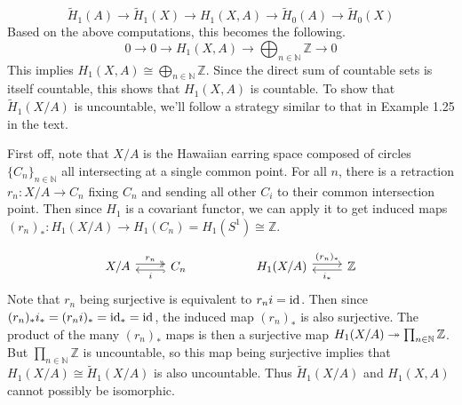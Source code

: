 \documentclass[twoside,10pt]{article}
\begin{document}
\[
	\tilde{H}_1(A) \to \tilde{H}_1(X) \to H_1(X,A) \to \tilde{H}_0(A) \to \tilde{H}_0(X)
\] Based on the above computations, this becomes the following.
\[
	0 \to  0 \to H_1(X,A) \to \bigoplus_{n\in \mathbb{N}} \mathbb{Z} \to 0
\] This implies $H_1(X,A) \cong \bigoplus_{n\in \mathbb{N}}\mathbb{Z}$. Since the direct sum of countable sets is itself countable, this shows that $H_1(X,A)$ is countable. To show that $\tilde{H}_1(X/A)$ is uncountable, we'll follow a strategy similar to that in Example 1.25 in the text.

First off, note that $X/A$ is the Hawaiian earring space composed of circles $\{C_{n}\}_{n \in \mathbb{N}}$ all intersecting at a single common point. For all $n$, there is a retraction $r_{n}:X/A \to C_{n}$ fixing $C_{n}$ and sending all other $C_i$ to their common intersection point. Then since $H_1$ is a covariant functor, we can apply it to get induced maps $(r_{n})_{*}:H_1(X/A)\to H_1(C_{n}) =H_1(S^{1}) \cong \mathbb{Z}$.

\[
\begin{tikzcd}
	X/A \rar[shift left,two heads]{r_{n}} & C_{n} \lar[shift left, hook]{i} & & H_1(X/A) \rar[shift left]{(r_{n})_{*}} & \mathbb{Z} \lar[shift left]{i_{*}}
\end{tikzcd}
\] 
Note that $r_{n}$ being surjective is equivalent to $r_{n}i = \operatorname{id}_{}$. Then since $(r_{n})_{*}i_{*} = (r_{n}i)_{*}= \operatorname{id}_{*}=\operatorname{id}_{}$, the induced map $(r_{n})_{*}$ is also surjective. The product of the many $(r_{n})_{*}$ maps is then a surjective map $H_1(X/A) \twoheadrightarrow \prod_{n \in \mathbb{N}}\mathbb{Z}$. But $\prod_{n \in \mathbb{N}}\mathbb{Z}$ is uncountable, so this map being surjective implies that $H_1(X/A) \cong \tilde{H}_1(X/A)$ is also uncountable. Thus $\tilde{H}_1(X/A)$ and $H_1(X,A)$ cannot possibly be isomorphic.
\end{document}
